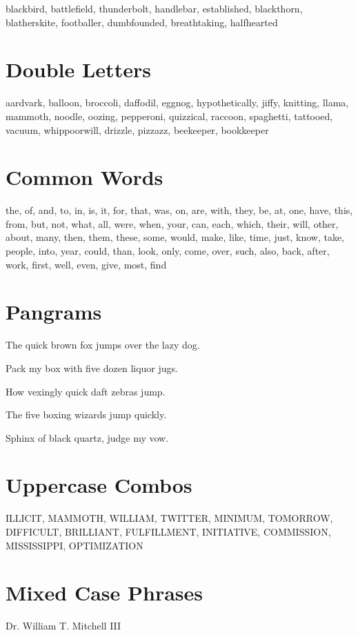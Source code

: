 \documentclass{article}
\begin{document}
blackbird, battlefield, thunderbolt, handlebar, established, blackthorn, blatherskite, footballer, dumbfounded, breathtaking, halfhearted

\section*{Double Letters}

aardvark, balloon, broccoli, daffodil, eggnog, hypothetically, jiffy, knitting, llama, mammoth, noodle, oozing, pepperoni, quizzical, raccoon, spaghetti, tattooed, vacuum, whippoorwill, drizzle, pizzazz, beekeeper, bookkeeper

\section*{Common Words}

the, of, and, to, in, is, it, for, that, was, on, are, with, they, be, at, one, have, this, from, but, not, what, all, were, when, your, can, each, which, their, will, other, about, many, then, them, these, some, would, make, like, time, just, know, take, people, into, year, could, than, look, only, come, over, such, also, back, after, work, first, well, even, give, most, find

\section*{Pangrams}

The quick brown fox jumps over the lazy dog.

Pack my box with five dozen liquor jugs.

How vexingly quick daft zebras jump.

The five boxing wizards jump quickly.

Sphinx of black quartz, judge my vow.

\section*{Uppercase Combos}

ILLICIT, MAMMOTH, WILLIAM, TWITTER, MINIMUM, TOMORROW, DIFFICULT, BRILLIANT, FULFILLMENT, INITIATIVE, COMMISSION, MISSISSIPPI, OPTIMIZATION

\section*{Mixed Case Phrases}

Dr. William T. Mitchell III
\end{document}
